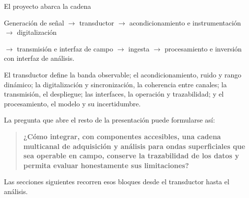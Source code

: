 El proyecto abarca la cadena

\begin{center}
\small
Generación de señal $\longrightarrow$ transductor $\longrightarrow$
acondicionamiento e instrumentación $\longrightarrow$ digitalización

$\longrightarrow$ transmisión e interfaz de campo $\longrightarrow$ ingesta
$\longrightarrow$ procesamiento e inversión con interfaz de análisis.
\end{center}

El transductor define la banda observable; el acondicionamiento, ruido y rango dinámico;
la digitalización y sincronización, la coherencia entre canales; la transmisión, el
despliegue; las interfaces, la operación y trazabilidad; y el procesamiento, el modelo y
su incertidumbre.

La pregunta que abre el resto de la presentación puede formularse así:

\begin{quote}
\textbf{¿Cómo integrar, con componentes accesibles, una cadena multicanal de
adquisición y análisis para ondas superficiales que sea operable en campo, conserve la
trazabilidad de los datos y permita evaluar honestamente sus limitaciones?}
\end{quote}

Las secciones siguientes recorren esos bloques desde el transductor hasta el análisis.
